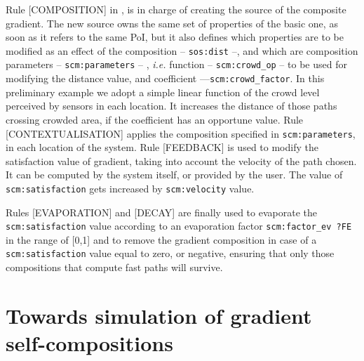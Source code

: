 \documentclass[12pt,a4paper,twoside,openright]{book}
\begin{document}
%
Rule [COMPOSITION] in , is in charge of creating the source of the composite gradient. The new source owns the same set of properties of the basic one, as soon as it refers to the same PoI, but it also defines which properties are to be modified as an effect of the composition  -- \texttt{sos:dist} --, and which are composition parameters -- \texttt{scm:parameters} -- , \emph{i.e.}  function -- \texttt{scm:crowd\_op} -- to be used for modifying the distance value, and coefficient ---\texttt{scm:crowd\_factor}. In this preliminary example we adopt a simple linear function of the crowd level perceived by sensors in each location. It increases the distance of those paths crossing crowded area, if the coefficient has an opportune value.
%
Rule [CONTEXTUALISATION]  applies the composition specified in \texttt{scm:parameters}, in each location of the system.
%
Rule [FEEDBACK] is used to modify the satisfaction value of gradient, taking into account the velocity of the path chosen. It can be computed by the system itself, or provided by the user. The value of \texttt{scm:satisfaction} gets increased by \texttt{scm:velocity} value.

Rules [EVAPORATION] and [DECAY] are finally used to evaporate the \texttt{scm:satisfaction} value according to an evaporation factor \texttt{scm:factor\_ev ?FE} in the range of [0,1] and to remove the gradient composition in case of a \texttt{scm:satisfaction} value equal to zero, or negative, ensuring that only those compositions that compute fast paths will survive.





\section{Towards simulation of gradient self-compositions}
\end{document}
